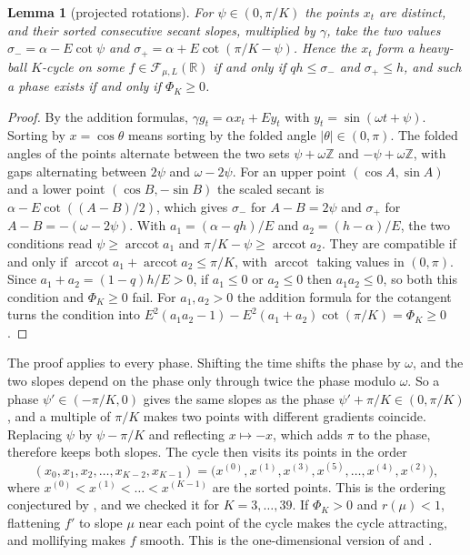 \documentclass[11pt, a4paper]{article}
\newtheorem{lemma}{Lemma}
\theoremstyle{definition}
\newcommand{\R}{\mathbb{R}}
\newcommand{\F}{\mathcal{F}_{\mu,L}}
\newcommand{\acot}{\operatorname{arccot}}
\begin{document}
\begin{lemma}[projected rotations]
  \label{lem:rotations}
  For $\psi\in(0,\pi/K)$ the points $x_t$ are distinct, and their sorted consecutive secant slopes, multiplied by
  $\gamma$, take the two values $\sigma_-=\alpha-E\cot\psi$ and $\sigma_+=\alpha+E\cot(\pi/K-\psi)$. Hence the $x_t$ form
  a heavy-ball $K$-cycle on some $f\in\F(\R)$ if and only if $qh\le\sigma_-$ and $\sigma_+\le h$, and such a phase exists
  if and only if $\Phi_K\ge0$.
\end{lemma}

\begin{proof}
  By the addition formulas, $\gamma g_t=\alpha x_t+Ey_t$ with $y_t=\sin(\omega t+\psi)$. Sorting by $x=\cos\theta$ means
  sorting by the folded angle $|\theta|\in(0,\pi)$. The folded angles of the points alternate between the two sets
  $\psi+\omega\mathbb Z$ and $-\psi+\omega\mathbb Z$, with gaps alternating between $2\psi$ and $\omega-2\psi$. For an
  upper point $(\cos A,\sin A)$ and a lower point $(\cos B,-\sin B)$ the scaled secant is $\alpha-E\cot((A-B)/2)$,
  which gives $\sigma_-$ for $A-B=2\psi$ and $\sigma_+$ for $A-B=-(\omega-2\psi)$. With $a_1=(\alpha-qh)/E$ and
  $a_2=(h-\alpha)/E$, the two conditions read $\psi\ge\acot a_1$ and $\pi/K-\psi\ge\acot a_2$. They are compatible if
  and only if $\acot a_1+\acot a_2\le\pi/K$, with $\acot$ taking values in $(0,\pi)$. Since $a_1+a_2=(1-q)h/E>0$, if
  $a_1\le0$ or $a_2\le0$ then $a_1a_2\le0$, so both this condition and $\Phi_K\ge0$ fail. For $a_1,a_2>0$ the addition
  formula for the cotangent turns the condition into $E^2(a_1a_2-1)-E^2(a_1+a_2)\cot(\pi/K)=\Phi_K\ge0$.
\end{proof}

The proof applies to every phase. Shifting the time shifts the phase by $\omega$, and the two slopes depend on the
phase only through twice the phase modulo $\omega$. So a phase $\psi'\in(-\pi/K,0)$ gives the same slopes as the phase
$\psi'+\pi/K\in(0,\pi/K)$, and a multiple of $\pi/K$ makes two points with different gradients coincide. Replacing $\psi$
by $\psi-\pi/K$ and reflecting $x\mapsto-x$, which adds $\pi$ to the phase, therefore keeps both slopes. The cycle then
visits its points in the order
\[
  (x_0,x_1,x_2,\dots,x_{K-2},x_{K-1})=\bigl(x^{(0)},x^{(1)},x^{(3)},x^{(5)},\dots,x^{(4)},x^{(2)}\bigr),
\]
where $x^{(0)}<x^{(1)}<\dots<x^{(K-1)}$ are the sorted points. This is the ordering conjectured by
\citet{goujaud2025riddles}, and we checked it for $K=3,\dots,39$. If $\Phi_K>0$ and $r(\mu)<1$,
flattening $f'$ to slope $\mu$ near each point of the cycle makes the cycle attracting, and mollifying makes $f$ smooth.
This is the one-dimensional version of \citet[§§4--5]{goujaud2025provable} and \citet[Thm.~8]{liu2026sharp}.
\end{document}
